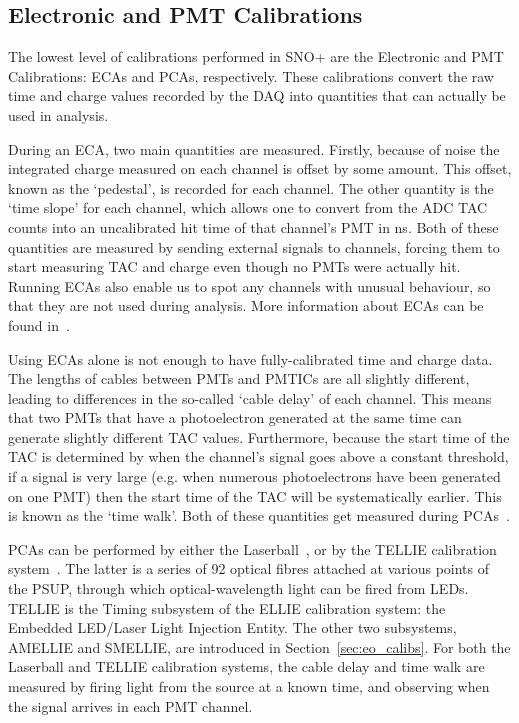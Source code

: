\subsection{Electronic and PMT Calibrations}
The lowest level of calibrations performed in SNO+ are the Electronic and PMT Calibrations: ECAs and PCAs, respectively. These calibrations convert the raw time and charge values recorded by the DAQ into quantities that can actually be used in analysis.

During an ECA, two main quantities are measured. Firstly, because of noise the integrated charge measured on each channel is offset by some amount. This offset, known as the `pedestal', is recorded for each channel. The other quantity is the `time slope' for each channel, which allows one to convert from the ADC TAC counts into an uncalibrated hit time of that channel's PMT in \si{\ns}. Both of these quantities are measured by sending external signals to channels, forcing them to start measuring TAC and charge even though no PMTs were actually hit. Running ECAs also enable us to spot any channels with unusual behaviour, so that they are not used during analysis. More information about ECAs can be found in~\cite{}. %

Using ECAs alone is not enough to have fully-calibrated time and charge data. The lengths of cables between PMTs and PMTICs are all slightly different, leading to differences in the so-called `cable delay' of each channel. This means that two PMTs that have a photoelectron generated at the same time can generate slightly different TAC values. Furthermore, because the start time of the TAC is determined by when the channel's signal goes above a constant threshold, if a signal is very large (e.g. when numerous photoelectrons have been generated on one PMT) then the start time of the TAC will be systematically earlier. This is known as the `time walk'. Both of these quantities get measured during PCAs~\cite{}. %

PCAs can be performed by either the Laserball~\cite{}, %
or by the TELLIE calibration system~\cite{}. %
The latter is a series of 92 optical fibres attached at various points of the PSUP, through which optical-wavelength light can be fired from LEDs. TELLIE is the Timing subsystem of the ELLIE calibration system: the Embedded LED/Laser Light Injection Entity. The other two subsystems, AMELLIE and SMELLIE, are introduced in Section~\ref{sec:eo_calibs}. For both the Laserball and TELLIE calibration systems, the cable delay and time walk are measured by firing light from the source at a known time, and observing when the signal arrives in each PMT channel.

